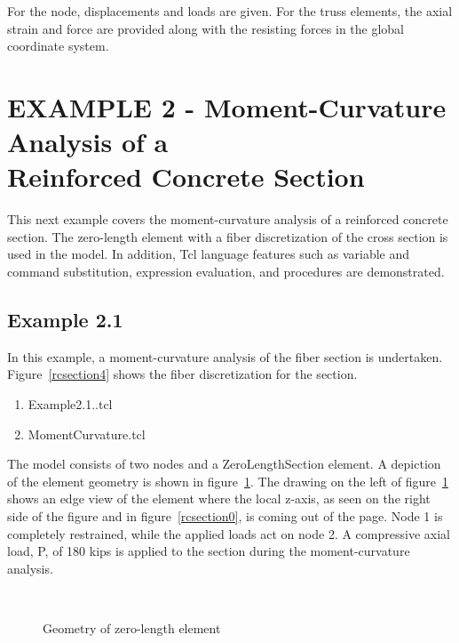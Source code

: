 \documentclass[12pt]{article}
\begin{document}
For the node, displacements and loads are given.  For the truss
elements, the axial strain and force are provided along with the 
resisting forces in the global coordinate system.




\pagebreak
\section{EXAMPLE 2 - Moment-Curvature Analysis of a \\ 
Reinforced Concrete Section} 

This next example covers the moment-curvature analysis of a reinforced 
concrete section. The zero-length element with a fiber discretization
of the cross section is used in the model. In addition, Tcl language 
features such as variable and command substitution, expression
evaluation, and procedures are demonstrated.

\subsection{Example 2.1}
In this example, a moment-curvature analysis of the fiber
section is undertaken. Figure~\ref{rcsection4}
shows the fiber discretization for the section.

\vspace{0.2in}  
\begin{enumerate} 
\item Example2.1..tcl
\item MomentCurvature.tcl
\end{enumerate}

\vspace{0.2in} 


The model consists of two nodes and a ZeroLengthSection element.
A depiction of the element geometry is shown in figure~\ref{zerolength}.
The drawing on the left of figure~\ref{zerolength} shows an edge
view of the element where the local z-axis, as seen on the right
side of the figure and in
figure~\ref{rcsection0}, is coming out of the page. Node 1 is
completely restrained, while the applied loads act on node 2.
A compressive axial load, P,  of 180 kips is applied to the section
during the moment-curvature analysis.

\begin{figure}[h]
\begin{center}
\leavevmode
\hbox{%
\epsfxsize=4.0in
}
\end{center}
\caption{Geometry of zero-length element}
\label{zerolength}
\end{figure}
\end{document}
